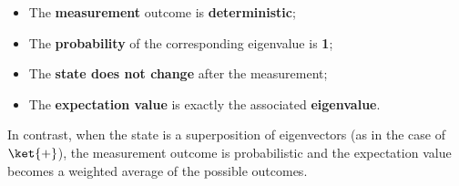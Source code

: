 \begin{itemize}
    \item The \textbf{measurement} outcome is \textbf{deterministic};
    \item The \textbf{probability} of the corresponding eigenvalue is \textbf{1};
    \item The \textbf{state does not change} after the measurement;
    \item The \textbf{expectation value} is exactly the associated \textbf{eigenvalue}.
\end{itemize}
In contrast, when the state is a superposition of eigenvectors (as in the case of $\ket{+}$), the measurement outcome is probabilistic and the expectation value becomes a weighted average of the possible outcomes.